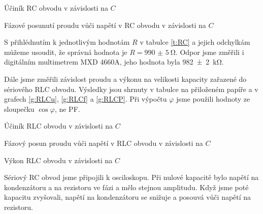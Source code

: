 \begin{graph}[htbp] 
\centering

\caption{Účiník RC obvodu v závislosti na $C$}
\label{g:RCucinik}
\end{graph}

\begin{graph}[htbp] 
\centering

\caption{Fázové posunutí proudu vůči napětí v RC obvodu v závislosti na $C$}
\label{g:RCfaze}
\end{graph}

S přihlédnutím k jednotlivým hodnotám $R$ v tabulce \ref{t:RC} a jejich odchylkám můžeme usoudit, že správná hodnota je $R=\SI{990(5)}{\ohm}$.
Odpor jsme změřili i digitálním multimetrem MXD 4660A, jeho hodnota byla \SI{982(2)}{\kilo\ohm}.

Dále jsme změřili závislost proudu a výkonu na velikosti kapacity zařazené do sériového RLC obvodu.
Výsledky jsou shrnuty v tabulce na přiloženém papíře a v grafech \ref{g:RLCu}, \ref{g:RLCf} a \ref{g:RLCP}.
Při výpočtu $\varphi$ jsme použili hodnoty ze sloupečku $\cos\varphi$, ne PF.

\begin{graph}[htbp] 
\centering

\caption{Účiník RLC obvodu v závislosti na $C$}
\label{g:RLCu}
\end{graph}

\begin{graph}[htbp] 
\centering

\caption{Fázový posun proudu vůči napětí v RLC obvodu v závislosti na $C$}
\label{g:RLCf}
\end{graph}

\begin{graph}[htbp] 
\centering

\caption{Výkon RLC obvodu v závislosti na $C$}
\label{g:RLCP}
\end{graph}


Sériový RC obvod jsme připojili k osciloskopu.
Při nulové kapacitě bylo napětí na kondenzátoru a na rezistoru ve fázi a mělo stejnou amplitudu. Když jsme poté kapacitu zvyšovali, napětí na kondenzátoru se snižuje a posouvá vůči napětí na rezistoru.